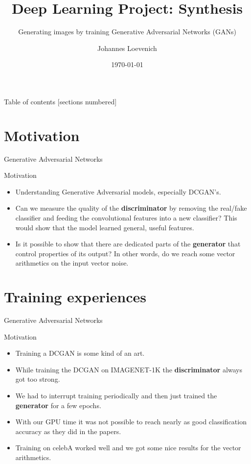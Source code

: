 \documentclass[10pt]{beamer}
\title{Deep Learning Project: Synthesis}
\subtitle{Generating images by training Generative Adversarial Networks (GANs)}
\date{\today}
\author{Johannes Loevenich}
\institute{University of Bonn}
\begin{document}
\maketitle

\begin{frame}{Table of contents}
  [sections numbered]
  \tableofcontents[hideallsubsections]
\end{frame}

\section{Motivation}

{
\begin{frame}{Generative Adversarial Networks}
      \begin{block}{Motivation}
	\begin{itemize}[<+- | alert@+>]
    \item Understanding Generative Adversarial models, especially DCGAN's.
    \item Can we measure the quality of the \textbf{discriminator} by removing the real/fake classifier and feeding the convolutional features into a new classifier? This would show that the model learned general, useful features.
    \item Is it possible to show that there are dedicated parts of the \textbf{generator} that control properties of its output? In other words, do we reach some vector arithmetics on the input vector noise.
  \end{itemize}
    \end{block}
\end{frame}
}

\section{Training experiences}

{
\begin{frame}{Generative Adversarial Networks}
      \begin{block}{Motivation}
	\begin{itemize}[<+- | alert@+>]
    \item Training a DCGAN is some kind of an art.
    \item While training the DCGAN on IMAGENET-1K the \textbf{discriminator} always got too strong. 
    \item We had to interrupt training periodically and then just trained the \textbf{generator} for a few epochs. 
    \item With our GPU time it was not possible to reach nearly as good classification accuracy as they did in the papers.
    \item Training on celebA worked well and we got some nice results for the vector arithmetics. 
  \end{itemize}
    \end{block}
\end{frame}
}
\end{document}
